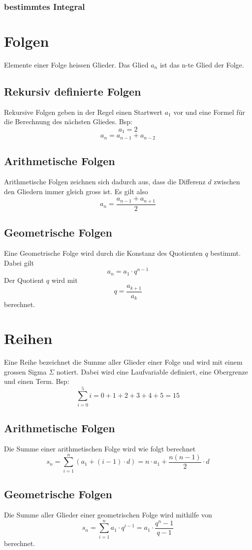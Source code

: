 \documentclass{article}
\begin{document}
\subsubsection{bestimmtes Integral}
\section{Folgen}
Elemente einer Folge heissen Glieder. Das Glied \(a_n\) ist das n-te Glied der Folge.
\subsection{Rekursiv definierte Folgen}
Rekursive Folgen geben in der Regel einen Startwert \(a_1\) vor und eine Formel für die Berechnung des nächsten Gliedes. Bsp: \[
a_1 = 2
\] \[
		a_n = a_{n-1} + a_{n-2}
\]
\subsection{Arithmetische Folgen}
Arithmetische Folgen zeichnen sich dadurch aus, dass die Differenz \(d\) zwischen den Gliedern immer gleich gross ist. Es gilt also \[
		a_n = \frac{a_{n-1} + a_{n+1}}{2} 
\]
\subsection{Geometrische Folgen}
Eine Geometrische Folge wird durch die Konstanz des Quotienten \(q\) bestimmt. Dabei gilt \[
		a_n = a_1 \cdot q^{n-1}
\]
Der Quotient \(q\) wird mit \[
		q = \frac{a_{k+1}}{a_k} 
\] berechnet.
\section{Reihen}
Eine Reihe bezeichnet die Summe aller Glieder einer Folge und wird mit einem grossen Sigma \(\Sigma\) notiert.
Dabei wird eine Laufvariable definiert, eine Obergrenze und einen Term. Bsp: \[
\sum_{i=0}^5 i = 0 + 1 + 2 + 3 + 4 + 5 = 15
\]
\subsection{Arithmetische Folgen}
Die Summe einer arithmetischen Folge wird wie folgt berechnet \[
		s_n = \sum_{i = 1}^n (a_1 + (i-1)\cdot d) = n \cdot a_1 + \frac{n(n-1)}{2} \cdot d
\]
\subsection{Geometrische Folgen}
Die Summe aller Glieder einer geometrischen Folge wird mithilfe von \[
		s_n = \sum_{i=1}^n a_1 \cdot q^{i-1} = a_1 \cdot \frac{q^n -1}{q-1} 
\] berechnet.
\end{document}
